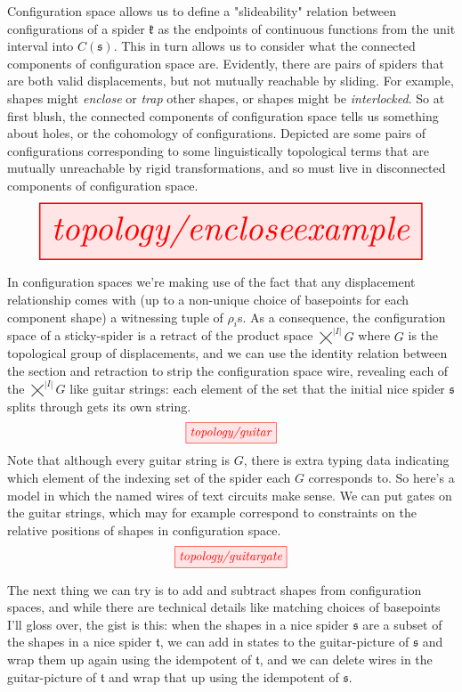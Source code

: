 \begin{example}
Configuration space allows us to define a "slideability" relation between configurations of a spider $\mathfrak{k}$ as the endpoints of continuous functions from the unit interval into $C(\mathfrak{s})$. This in turn allows us to consider what the connected components of configuration space are. Evidently, there are pairs of spiders that are both valid displacements, but not mutually reachable by sliding. For example, shapes might \emph{enclose} or \emph{trap} other shapes, or shapes might be \emph{interlocked}. So at first blush, the connected components of configuration space tells us something about holes, or the cohomology of configurations. Depicted are some pairs of configurations corresponding to some linguistically topological terms that are mutually unreachable by rigid transformations, and so must live in disconnected components of configuration space.
\[\resizebox{\textwidth}{!}{\tikzfig{topology/encloseexample}}\]
\end{example}

In configuration spaces we're making use of the fact that any displacement relationship comes with (up to a non-unique choice of basepoints for each component shape)  a witnessing tuple of $\rho_i$s. As a consequence, the configuration space of a sticky-spider is a retract of the product space $\bigtimes^{|I|} G$ where $G$ is the topological group of displacements, and we can use the identity relation between the section and retraction to strip the configuration space wire, revealing each of the $\bigtimes^{|I|} G$ like guitar strings: each element of the set that the initial nice spider $\mathfrak{s}$ splits through gets its own string.
\[\tikzfig{topology/guitar}\]
Note that although every guitar string is $G$, there is extra typing data indicating which element of the indexing set of the spider each $G$ corresponds to. So here's a model in which the named wires of text circuits make sense. We can put gates on the guitar strings, which may for example correspond to constraints on the relative positions of shapes in configuration space.
\[\tikzfig{topology/guitargate}\]

The next thing we can try is to add and subtract shapes from configuration spaces, and while there are technical details like matching choices of basepoints I'll gloss over, the gist is this: when the shapes in a nice spider $\mathfrak{s}$ are a subset of the shapes in a nice spider $\mathfrak{t}$, we can add in states to the guitar-picture of $\mathfrak{s}$ and wrap them up again using the idempotent of $\mathfrak{t}$, and we can delete wires in the guitar-picture of $\mathfrak{t}$ and wrap that up using the idempotent of $\mathfrak{s}$.


